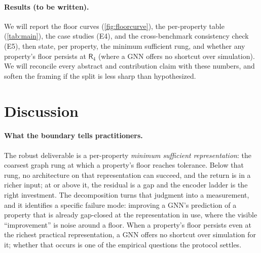 \documentclass[10pt]{article}
\newcommand{\R}{\mathsf{R}}
\begin{document}
\paragraph{Results (to be written).}
We will report the floor curves (\cref{fig:floorcurve}), the per-property table (\cref{tab:main}), the case studies (E4), and the cross-benchmark consistency check (E5), then state, per property, the minimum sufficient rung, and whether any property's floor persists at $\R_4$ (where a GNN offers no shortcut over simulation). We will reconcile every abstract and contribution claim with these numbers, and soften the framing if the split is less sharp than hypothesized.

\section{Discussion}

\paragraph{What the boundary tells practitioners.}
The robust deliverable is a per-property \emph{minimum sufficient representation}: the coarsest graph rung at which a property's floor reaches tolerance. Below that rung, no architecture on that representation can succeed, and the return is in a richer input; at or above it, the residual is a gap and the encoder ladder is the right investment. The decomposition turns that judgment into a measurement, and it identifies a specific failure mode: improving a GNN's prediction of a property that is already gap-closed at the representation in use, where the visible ``improvement'' is noise around a floor. When a property's floor persists even at the richest practical representation, a GNN offers no shortcut over simulation for it; whether that occurs is one of the empirical questions the protocol settles.
\end{document}
